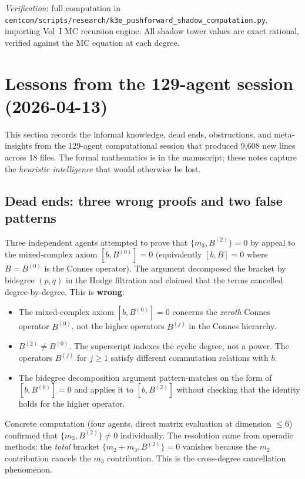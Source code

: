 \documentclass[11pt]{article}
\begin{document}
\noindent\textit{Verification}: full computation in \texttt{centcom/scripts/research/k3e\_pushforward\_shadow\_computation.py}, importing Vol~I MC recursion engine. All shadow tower values are exact rational, verified against the MC equation at each degree.

\section{Lessons from the 129-agent session (2026-04-13)}
\label{sec:129-agent-session}

This section records the informal knowledge, dead ends, obstructions,
and meta-insights from the 129-agent computational session that produced
9,608 new lines across 18 files. The formal mathematics is in the
manuscript; these notes capture the \emph{heuristic intelligence} that
would otherwise be lost.

\subsection{Dead ends: three wrong proofs and two false patterns}
\label{subsec:dead-ends}

\begin{warning}[Dead end 1: bidegree decomposition ``proof'' of ${{[m_3, B^{(2)}] = 0}}$]
\label{warn:dead-end-bidegree}
Three independent agents attempted to prove that $\{m_3, B^{(2)}\} = 0$
by appeal to the mixed-complex axiom $[b, B^{(0)}] = 0$ (equivalently
$[b, B] = 0$ where $B = B^{(0)}$ is the Connes operator). The argument
decomposed the bracket by bidegree $(p, q)$ in the Hodge filtration and
claimed that the terms cancelled degree-by-degree. This is \textbf{wrong}:
\begin{itemize}
 \item The mixed-complex axiom $[b, B^{(0)}] = 0$ concerns the
 \emph{zeroth} Connes operator $B^{(0)}$, not the higher operators
 $B^{(j)}$ in the Connes hierarchy.
 \item $B^{(2)} \neq B^{(0)}$. The superscript indexes the cyclic
 degree, not a power. The operators $B^{(j)}$ for $j \geq 1$ satisfy
 different commutation relations with $b$.
 \item The bidegree decomposition argument pattern-matches on the
 form of $[b, B^{(0)}] = 0$ and applies it to $[b, B^{(2)}]$
 without checking that the identity holds for the higher operator.
\end{itemize}
Concrete computation (four agents, direct matrix evaluation at
dimension $\leq 6$) confirmed that $\{m_3, B^{(2)}\} \neq 0$
individually. The resolution came from operadic methods: the
\emph{total} bracket $\{m_2 + m_3, B^{(2)}\} = 0$ vanishes because
the $m_2$ contribution cancels the $m_3$ contribution. This is the
cross-degree cancellation phenomenon.
\end{warning}
\end{document}
